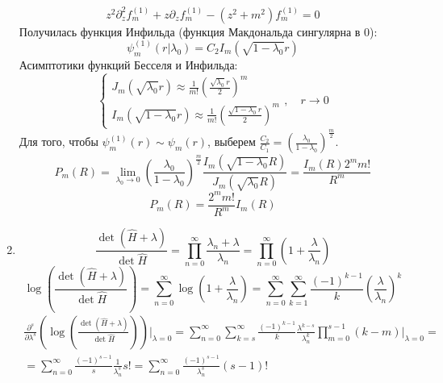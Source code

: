 \documentclass[12pt]{article}
\theoremstyle{definition}
\begin{document}
\begin{enumerate}
    \begin{equation}
        z^2\partial^2_zf^{(1)}_m+z\partial_zf^{(1)}_m-(z^2+m^2)f^{(1)}_m=0
    \end{equation}
    Получилась функция Инфильда (функция Макдональда сингулярна в 0):
    \begin{equation}
        \psi^{(1)}_m(r|\lambda_0)=C_2I_m(\sqrt{1-\lambda_0}r)
    \end{equation}
    Асимптотики функций Бесселя и Инфильда:
    \begin{equation}
    \begin{cases}
        J_m(\sqrt{\lambda_0}r)\approx\frac{1}{m!}\left(\frac{\sqrt{\lambda_0}r}{2}\right)^m\\
        I_m(\sqrt{1-\lambda_0}r)\approx\frac{1}{m!}\left(\frac{\sqrt{1-\lambda_0}r}{2}\right)^m
    \end{cases},\quad r\rightarrow0
    \end{equation}
    Для того, чтобы $\psi^{(1)}_m(r)\sim \psi_m(r)$, выберем $\frac{C_2}{C_1}=\left(\frac{\lambda_0}{1-\lambda_0}\right)^\frac{m}{2}$.
    \begin{equation}
        P_m(R)=\lim\limits_{\lambda_0\rightarrow0}\left(\frac{\lambda_0}{1-\lambda_0}\right)^\frac{m}{2}\frac{I_m(\sqrt{1-\lambda_0}R)}{J_m(\sqrt{\lambda_0}R)}=\frac{I_m(R)2^mm!}{R^m}
    \end{equation}
    \begin{equation}
        \boxed{P_m(R)=\frac{2^mm!}{R^m}I_m(R)}
    \end{equation}
    \item
    \begin{equation}
        \frac{\det(\hat{H}+\lambda)}{\det\hat{H}}=\prod\limits_{n=0}^\infty\frac{\lambda_n+\lambda}{\lambda_n}=\prod\limits_{n=0}^\infty\left(1+\frac{\lambda}{\lambda_n}\right)
    \end{equation}
    \begin{equation}
        \log\left(\frac{\det(\hat{H}+\lambda)}{\det\hat{H}}\right)=\sum\limits_{n=0}^\infty\log\left(1+\frac{\lambda}{\lambda_n}\right)=\sum\limits_{n=0}^\infty\sum\limits_{k=1}^\infty\frac{(-1)^{k-1}}{k}\left(\frac{\lambda}{\lambda_n}\right)^k
    \end{equation}
    \begin{multline}
        \frac{\partial^s}{\partial\lambda^s}\left(\log\left(\frac{\det(\hat{H}+\lambda)}{\det{\hat{H}}}\right)\right)\bigg|_{\lambda=0}=\sum\limits_{n=0}^\infty\sum\limits_{k=s}^\infty\frac{(-1)^{k-1}}{k}\frac{\lambda^{k-s}}{\lambda^k_n}\prod\limits_{m=0}^{s-1}(k-m)\bigg|_{\lambda=0}=\\=\sum\limits_{n=0}^\infty\frac{(-1)^{s-1}}{s}\frac{1}{\lambda^s_n}s!=\sum\limits_{n=0}^\infty\frac{(-1)^{s-1}}{\lambda^s_n}(s-1)!

\end{multline}
\end{enumerate}
\end{document}
